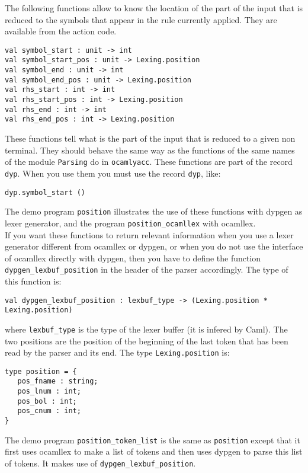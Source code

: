 \documentclass[12pt]{article}
\begin{document}
{The following functions allow to know the location of the part of the input that is reduced to the symbols that appear in the rule currently applied. They are available from the action code.
\begin{verbatim}
val symbol_start : unit -> int
val symbol_start_pos : unit -> Lexing.position
val symbol_end : unit -> int
val symbol_end_pos : unit -> Lexing.position
val rhs_start : int -> int
val rhs_start_pos : int -> Lexing.position
val rhs_end : int -> int
val rhs_end_pos : int -> Lexing.position
\end{verbatim}
These functions tell what is the part of the input that is reduced to a given non terminal. They should behave the same way as the functions of the same names of the module \texttt{Parsing} do in \texttt{ocamlyacc}.
These functions are part of the record \verb|dyp|. When you use them you must use the record \verb|dyp|, like:
\begin{verbatim}
dyp.symbol_start ()
\end{verbatim}

The demo program \verb|position| illustrates the use of these functions with dypgen as lexer generator, and the program \verb|position_ocamllex| with ocamllex.\\

If you want these functions to return relevant information when you use a lexer generator different from ocamllex or dypgen, or when you do not use the interface of ocamllex directly with dypgen, then you have to define the function \verb|dypgen_lexbuf_position| in the header of the parser accordingly. The type of this function is:
\begin{verbatim}
val dypgen_lexbuf_position : lexbuf_type -> (Lexing.position * Lexing.position)
\end{verbatim}
where \verb|lexbuf_type| is the type of the lexer buffer (it is infered by Caml). The two positions are the position of the beginning of the last token that has been read by the parser and its end. The type \verb|Lexing.position| is:
\begin{verbatim}
type position = {
   pos_fname : string;
   pos_lnum : int;
   pos_bol : int;
   pos_cnum : int;
}
\end{verbatim}

The demo program \verb|position_token_list| is the same as \verb|position| except that it first uses ocamllex to make a list of tokens and then uses dypgen to parse this list of tokens. It makes use of \verb|dypgen_lexbuf_position|.\\

}
\end{document}
